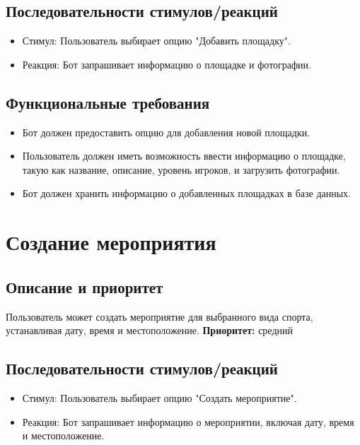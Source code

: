 \documentclass{scrreprt}
\begin{document}
\subsection{Последовательности стимулов/реакций}
\begin{itemize}
    \item Стимул: Пользователь выбирает опцию "Добавить площадку".
    \item Реакция: Бот запрашивает информацию о площадке и фотографии.
\end{itemize}

\subsection{Функциональные требования}
\begin{itemize}
    \item Бот должен предоставить опцию для добавления новой площадки.
    \item Пользователь должен иметь возможность ввести информацию о площадке, такую как название, описание, уровень игроков, и загрузить фотографии.
    \item Бот должен хранить информацию о добавленных площадках в базе данных.
\end{itemize}

\section{Создание мероприятия}

\subsection{Описание и приоритет}
Пользователь может создать мероприятие для выбранного вида спорта, устанавливая дату, время и местоположение.
\newline
\textbf{Приоритет:} средний

\subsection{Последовательности стимулов/реакций}
\begin{itemize}
    \item Стимул: Пользователь выбирает опцию "Создать мероприятие".
    \item Реакция: Бот запрашивает информацию о мероприятии, включая дату, время и местоположение.
\end{itemize}
\end{document}
